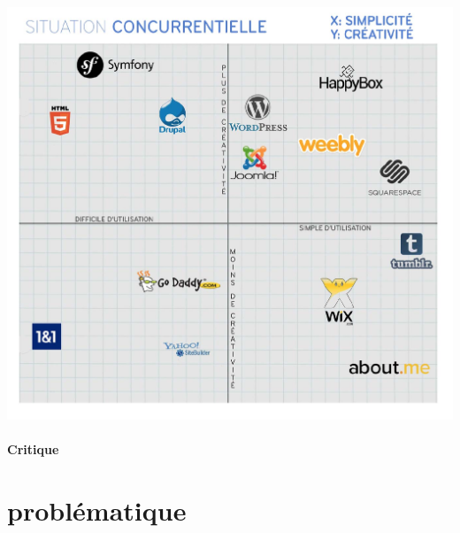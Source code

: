 \documentclass[11pt, a4paper ]{article}
\let\stdsection\section
\renewcommand\section{\newpage\stdsection}
\begin{document}
\begin{spacing}{1.5}
\begin{center}
	\includegraphics[width=\textwidth]{images/media/concurenceHBCMS}
\end{center}

		\paragraph{Critique}


		\section{problématique} %




\end{spacing}
\end{document}
